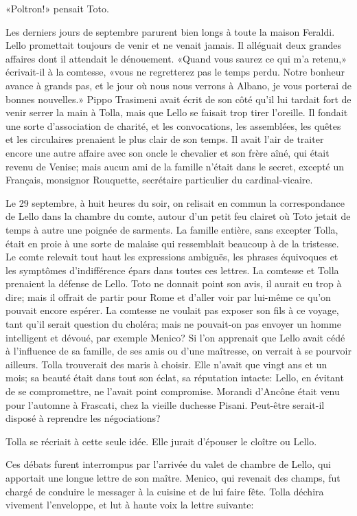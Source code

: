 «Poltron!» pensait Toto.

Les derniers jours de septembre parurent bien longs à toute la maison
Feraldi. Lello promettait toujours de venir et ne venait jamais. Il
alléguait deux grandes affaires dont il attendait le dénouement. «Quand
vous saurez ce qui m'a retenu,» écrivait-il à la comtesse, «vous ne
regretterez pas le temps perdu. Notre bonheur avance à grands pas, et le
jour où nous nous verrons à Albano, je vous porterai de bonnes
nouvelles.» Pippo Trasimeni avait écrit de son côté qu'il lui tardait
fort de venir serrer la main à Tolla, mais que Lello se faisait trop
tirer l'oreille. Il fondait une sorte d'association de charité, et les
convocations, les assemblées, les quêtes et les circulaires prenaient le
plus clair de son temps. Il avait l'air de traiter encore une autre
affaire avec son oncle le chevalier et son frère aîné, qui était revenu
de Venise; mais aucun ami de la famille n'était dans le secret, excepté
un Français, monsignor Rouquette, secrétaire particulier du
cardinal-vicaire.

Le 29 septembre, à huit heures du soir, on relisait en commun la
correspondance de Lello dans la chambre du comte, autour d'un petit feu
clairet où Toto jetait de temps à autre une poignée de sarments. La
famille entière, sans excepter Tolla, était en proie à une sorte de
malaise qui ressemblait beaucoup à de la tristesse. Le comte relevait
tout haut les expressions ambiguës, les phrases équivoques et les
symptômes d'indifférence épars dans toutes ces lettres. La comtesse et
Tolla prenaient la défense de Lello. Toto ne donnait point son avis, il
aurait eu trop à dire; mais il offrait de partir pour Rome et d'aller
voir par lui-même ce qu'on pouvait encore espérer. La comtesse ne
voulait pas exposer son fils à ce voyage, tant qu'il serait question du
choléra; mais ne pouvait-on pas envoyer un homme intelligent et dévoué,
par exemple Menico? Si l'on apprenait que Lello avait cédé à l'influence
de sa famille, de ses amis ou d'une maîtresse, on verrait à se pourvoir
ailleurs. Tolla trouverait des maris à choisir. Elle n'avait que vingt
ans et un mois; sa beauté était dans tout son éclat, sa réputation
intacte: Lello, en évitant de se compromettre, ne l'avait point
compromise. Morandi d'Ancône était venu pour l'automne à Frascati, chez
la vieille duchesse Pisani. Peut-être serait-il disposé à reprendre les
négociations?

Tolla se récriait à cette seule idée. Elle jurait d'épouser le cloître
ou Lello.

Ces débats furent interrompus par l'arrivée du valet de chambre de
Lello, qui apportait une longue lettre de son maître. Menico, qui
revenait des champs, fut chargé de conduire le messager à la cuisine et
de lui faire fête. Tolla déchira vivement l'enveloppe, et lut à haute
voix la lettre suivante:

